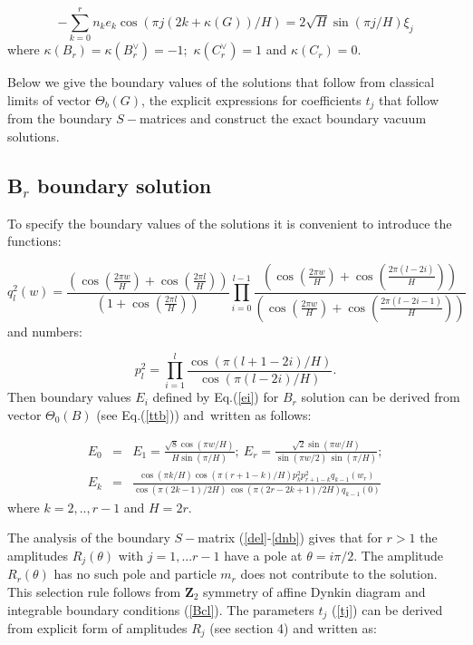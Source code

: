 \documentclass[a4paper,12pt,titlepage,final]{article}
\begin{document}
\begin{equation}
-\sum_{k=0}^{r}n_{k}e_{k}\cos (\pi j(2k+\kappa (G))/H)=2\sqrt{H}\sin (\pi
j/H)\xi _{j}  \label{eks}
\end{equation}
where $\kappa (B_{r})=\kappa (B_{r}^{\vee })=-1;$ $\kappa
(C_{r}^{\vee })=1$ and $\kappa (C_{r})=0$.

Below we give the boundary values of the solutions that follow from
classical limits of vector $\Theta _{b}(G)$, the explicit expressions for
coefficients $t_{j}$ that follow from the boundary $S-$matrices and
construct the exact boundary vacuum solutions.

\subsection{B$_{r}$ boundary solution}

To specify the boundary values of the solutions it is convenient to
introduce the functions:

\begin{equation}
q_{l}^{2}(w)=\frac{(\cos (\frac{2\pi w}{H})+\cos (\frac{2\pi l}{H}))}
{(1+\cos (\frac{2\pi l}{H}))}
\prod_{i=0}^{l-1}\frac{(\cos (\frac{2\pi w}{H})+
\cos (\frac{2\pi (l-2i)}{H}))}{(\cos (\frac{2\pi w}{H})+\cos (\frac{2\pi
(l-2i-1)}{H}))}  \label{h}
\end{equation}
and numbers:

\begin{equation}
p_{l}^{2}=\prod_{i=1}^{l}\frac{\cos (\pi (l+1-2i)/H)}{\cos (\pi (l-2i)/H)}.
\label{p}
\end{equation}
Then boundary values $E_{i}$ defined by Eq.(\ref{ei}) for $B_{r}$ solution
can be derived from vector $\Theta _{0}(B)$ (see Eq.(\ref{ttb})) and\
written as follows:

\begin{eqnarray}
E_{0} &=&E_{1}=\frac{\sqrt{8}\cos (\pi w/H)}{H\sin (\pi /H)};~E_{r}=
\frac{\sqrt{2}\sin (\pi w/H)}{\sin (\pi w/2)\,\sin (\pi /H)};  \nonumber \\
E_{k} &=&\frac{\cos (\pi k/H)\cos (\pi
(r+1-k)/H)p_{k}^{2}p_{r+1-k}^{2}q_{k-1}(w_{r})}{\cos (\pi (2k-1)/2H)\,\cos
(\pi (2r-2k+1)/2H)q_{k-1}(0)}  \label{eb}
\end{eqnarray}
where $k=2,..,r-1$ and $H=2r$.

The analysis of the boundary $S-$matrix (\ref{del}-\ref{dnb}) gives that
for
$r>1$ the amplitudes $R_{j}(\theta )$ with $j=1,...r-1$ have a pole at
$\theta =i\pi /2$. The amplitude $R_{r}(\theta )$ has no such pole and
particle $m_{r}$ does not contribute to the solution. This selection rule
follows from $\mathbf{Z}_{2}$ symmetry of affine Dynkin diagram and
integrable boundary conditions (\ref{Bcl}). The parameters $t_{j}$
(\ref{tj})
can be derived from explicit form of amplitudes $R_{j}$ (see section 4)
and written as:
\end{document}

